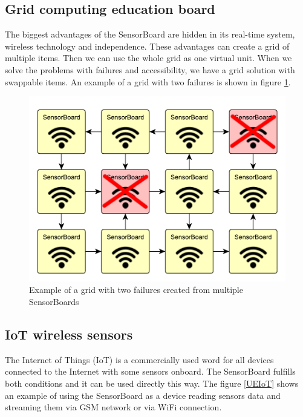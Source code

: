 \subsection{Grid computing education board}
\label{ExampleGrid}
The biggest advantages of the SensorBoard are hidden in its real-time system, wireless technology and independence. These advantages can create a grid of multiple items. Then we can use the whole grid as one virtual unit. When we solve the problems with failures and accessibility, we have a grid solution with swappable items. An example of a grid with two failures is shown in figure \ref{UEgrid}.

\begin{figure}
    \centering
    \label{UEgrid}
    \caption{Example of a grid with two failures created from multiple SensorBoards}
    \includegraphics[width=\linewidth]{img/UsageExamplesGrid.pdf}
\end{figure}

\subsection{\ac{IoT} wireless sensors}
The Internet of Things (\ac{IoT}) is a commercially used word for all devices connected to the Internet with some sensors onboard. The SensorBoard fulfills both conditions and it can be used directly this way. The figure \ref{UEIoT} shows an example of using the SensorBoard as a device reading sensors data and streaming them via GSM network or via WiFi connection.

